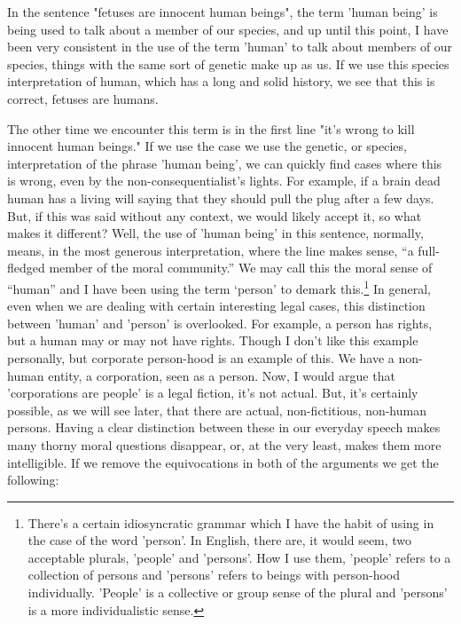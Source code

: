 In the sentence "fetuses are innocent human beings", the term 'human being' is being used to talk about a member of our species, and up until this point, I have been very consistent in the use of the term 'human' to talk about members of our species, things with the same sort of genetic make up as us. If we use this species interpretation of human, which has a long and solid history, we see that this is correct, fetuses are humans.

The other time we encounter this term is in the first line "it's wrong to kill innocent human beings." If we use the case we use the genetic, or species, interpretation of the phrase 'human being', we can quickly find cases where this is wrong, even by the non-consequentialist's lights. For example, if a brain dead human has a living will saying that they should pull the plug after a few days. But, if this was said without any context, we would likely accept it, so what makes it different? Well, the use of 'human being' in this sentence, normally, means, in the most generous interpretation, where the line makes sense,  “a full-fledged member of the moral community.” We may call this the moral sense of “human” and I have been using the term ‘person’ to demark this.\footnote{There's a certain idiosyncratic grammar which I have the habit of using in the case of the word 'person'. In English, there are, it would seem, two acceptable plurals, 'people' and 'persons'. How I use them, 'people' refers to a collection of persons and 'persons' refers to beings with person-hood individually. 'People' is a collective or group sense of the plural and 'persons' is a more individualistic sense.} In general, even when we are dealing with certain interesting legal cases, this distinction between 'human' and 'person' is overlooked. For example, a person has rights, but a human may or may not have rights. Though I don't like this example personally, but corporate person-hood is an example of this. We have a non-human entity, a corporation, seen as a person. Now, I would argue that 'corporations are people' is a legal fiction, it's not actual. But, it's certainly possible, as we will see later, that there are actual, non-fictitious, non-human persons. Having a clear distinction between these in our everyday speech makes many thorny moral questions disappear, or, at the very least, makes them more intelligible. If we remove the equivocations in both of the arguments we get the following:
\noindent
